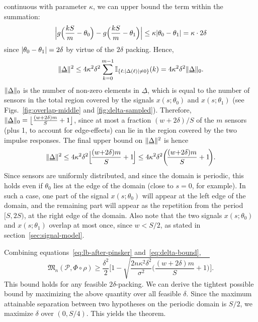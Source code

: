 \documentclass[conference,letterpaper]{IEEEtran}
\providecommand{\v}{}
\renewcommand{\v}[1]{\underline{#1}}
\DeclarePairedDelimiter\abs{\lvert}{\rvert}
\DeclarePairedDelimiter\norm{\lVert}{\rVert}
\DeclarePairedDelimiter\floor{\lfloor}{\rfloor}
\newcommand{\Phiorho}{\Phi\!\circ\!\rho}
\begin{document}
\begin{IEEEproof}
continuous with parameter $\kappa$, we can upper bound the term within the
summation:
\begin{equation}
	\abs[\Big]{g\Big(\frac{kS}{m} - \theta_0\Big) - g\Big(\frac{kS}{m} - \theta_1\Big)} \leq \kappa \abs{\theta_0 - \theta_1} = \kappa \cdot 2\delta
\end{equation}
since $\abs{\theta_0 - \theta_1} = 2\delta$ by virtue of the $2\delta$ packing.
Hence,
\begin{equation}
	\norm{\v\Delta}^2 \leq 4 \kappa^2 \delta^2 \sum_{k=0}^{m-1} \mathbb I_{\{\ell: \abs{\Delta(\ell)} \neq 0\}}(k) = 4 \kappa^2 \delta^2 \norm{\v\Delta}_0.
\end{equation}
$\norm{\v\Delta}_0$ is the number of non-zero elements in $\v\Delta$, which is
equal to the number of sensors in the total region covered by the signals
$x(s;\theta_0)$ and $x(s;\theta_1)$ (see Figs.~\ref{fig:overlap-middle} and
\ref{fig:delta-sampled}). Therefore, $\norm{\v\Delta}_0 = \floor[\big]{\frac{(w
+ 2\delta)m}{S} + 1}$, since at most a fraction $(w + 2\delta) / S$ of the $m$
sensors (plus 1, to account for edge-effects) can lie in the region covered by
the two impulse responses. The final upper bound on $\norm{\v\Delta}^2$ is
hence
\begin{equation} \label{eq:delta-bound}
	\norm{\v\Delta}^2 \leq 4 \kappa^2 \delta^2 \floor[\Big]{\!\frac{(w{+}2\delta)m}{S} + 1\!} \leq 4 \kappa^2 \delta^2 \bigg(\!\frac{(w{+}2\delta) m}{S} + 1\!\bigg).
\end{equation}
Since sensors are uniformly distributed, and since the domain is periodic, this
holds even if $\theta_0$ lies at the edge of the domain (close to $s=0$, for
example). In such a case, one part of the signal $x(s;\theta_0)$ will appear at
the left edge of the domain, and the remaining part will appear as the
repetition from the period $[S, 2S)$, at the right edge of the domain. Also
note that the two signals $x(s;\theta_0)$ and $x(s;\theta_1)$ overlap at most
once, since $w < S/2$, as stated in section~\ref{sec:signal-model}.

Combining equations~\eqref{eq:lb-after-pinsker} and~\eqref{eq:delta-bound},
\begin{equation} \label{eq:lb-after-delta-bound}
	\mathfrak{M}_n(\mathcal{P}, \Phiorho) \geq \frac{\delta^2}{2} \Bigg[1 - \sqrt{\frac{2n \kappa^2 \delta^2}{\sigma^2}\bigg(\!\frac{(w{+}2\delta) m}{S} + 1\!\bigg)} \Bigg].
\end{equation}
This bound holds for any feasible $2\delta$-packing. We can derive the tightest
possible bound by maximizing the above quantity over all feasible $\delta$.
Since the maximum attainable separation between two hypotheses on the periodic
domain is $S/2$, we maximize $\delta$ over $(0, S/4)$. This yields the theorem.


\end{IEEEproof}
\end{document}
